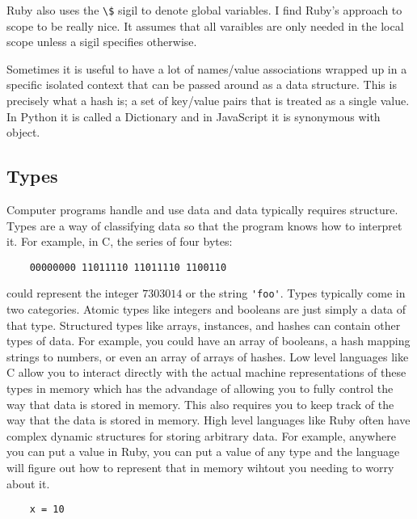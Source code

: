\documentclass[11pt]{article}
\begin{document}
   
   Ruby also uses the \verb|\$| sigil to denote global variables.  I
   find Ruby's approach to scope to be really nice.  It assumes that
   all varaibles are only needed in the local scope unless a sigil
   specifies otherwise.
   
   Sometimes it is useful to have a lot of names/value associations
   wrapped up in a specific isolated context that can be passed around
   as a data structure.  This is precisely what a hash is; a set of
   key/value pairs that is treated as a single value.  In Python it is
   called a Dictionary and in JavaScript it is synonymous with
   object.
   
\subsection*{Types}
\label{sec-1.3}

   Computer programs handle and use data and data typically requires
   structure.  Types are a way of classifying data so that the program
   knows how to interpret it.  For example, in C, the series of four
   bytes:
   
\begin{verbatim}
    00000000 11011110 11011110 1100110
\end{verbatim}

   
   could represent the integer $7303014$ or the string \verb|'foo'|.
   Types typically come in two categories.  Atomic types like
   integers and booleans are just simply a data of that type.
   Structured types like arrays, instances, and hashes can contain
   other types of data.  For example, you could have an array of
   booleans, a hash mapping strings to numbers, or even an array of
   arrays of hashes.  Low level languages like C allow you to interact
   directly with the actual machine representations of these types in
   memory which has the advandage of allowing you to fully control the
   way that data is stored in memory.  This also requires you to keep
   track of the way that the data is stored in memory.  High level
   languages like Ruby often have complex dynamic structures for
   storing arbitrary data.  For example, anywhere you can put a value
   in Ruby, you can put a value of any type and the language will
   figure out how to represent that in memory wihtout you needing to
   worry about it.
   
\begin{verbatim}
    x = 10
\end{verbatim}
\end{document}
